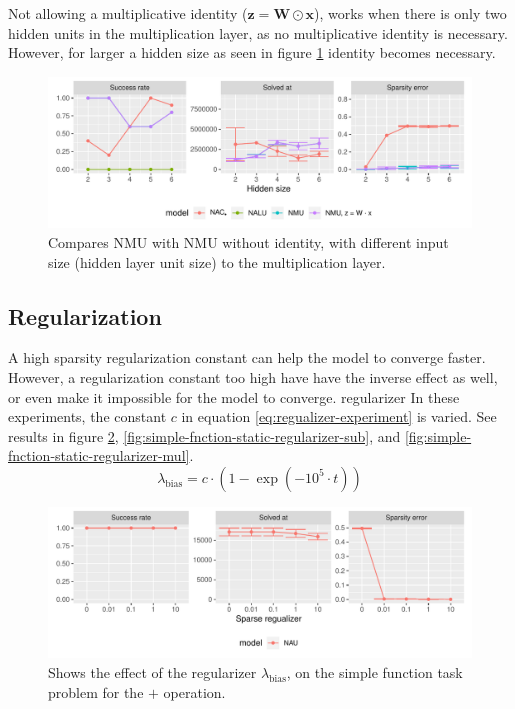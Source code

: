 Not allowing a multiplicative identity ($\mathbf{z} = \mathbf{W} \odot \mathbf{x}$), works when there is only two hidden units in the multiplication layer, as no multiplicative identity is necessary. However, for larger a hidden size as seen in figure \ref{fig:simple-function-static-ablation-hidden-size} identity becomes necessary.
\begin{figure}[h]
\centering
\includegraphics[width=\linewidth]{results/simple_function_static_ablation_hidden_size.pdf}
\caption{Compares NMU with NMU without identity, with different input size (hidden layer unit size) to the multiplication layer.}
\label{fig:simple-function-static-ablation-hidden-size}
\end{figure}

\clearpage
\subsection{Regularization}
\label{sec:appendix:simple-function-task:regualization}
A high sparsity regularization constant can help the model to converge faster. However, a regularization constant too high have have the inverse effect as well, or even make it impossible for the model to converge.
regularizer
In these experiments, the constant $c$ in equation \ref{eq:regualizer-experiment} is varied. See results in figure \ref{fig:simple-fnction-static-regularizer-add}, \ref{fig:simple-fnction-static-regularizer-sub}, and \ref{fig:simple-fnction-static-regularizer-mul}.
\begin{equation}
\lambda_{\mathrm{bias}} = c \cdot (1 - \exp(-10^5 \cdot t))
\label{eq:regualizer-experiment}
\end{equation}

\begin{figure}[h]
\centering
\includegraphics[width=\linewidth]{results/simple_function_static_regualization_add.pdf}
\caption{Shows the effect of the regularizer $\lambda_{\mathrm{bias}}$, on the simple function task problem for the $\bm{+}$ operation.}
\label{fig:simple-fnction-static-regularizer-add}
\end{figure}


